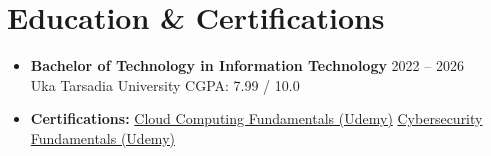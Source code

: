\documentclass[10pt]{article}
\begin{document}
\section{Education \& Certifications}
\begin{itemize}[label={}, leftmargin=0pt]
  \item \textbf{Bachelor of Technology in Information Technology} \hfill 2022 -- 2026 \\
  Uka Tarsadia University \hfill CGPA: 7.99 / 10.0
  \item \textbf{Certifications:} \href{https://www.udemy.com/certificate/UC-c12fca53-ef2a-493b-8431-a8d501dd73a0/}{Cloud Computing Fundamentals (Udemy)} \quad \textbullet \quad \href{https://www.udemy.com/certificate/UC-c02c2081-b2a4-458d-89fd-e1c878dcb4f5/}{Cybersecurity Fundamentals (Udemy)}
\end{itemize}
\end{document}
